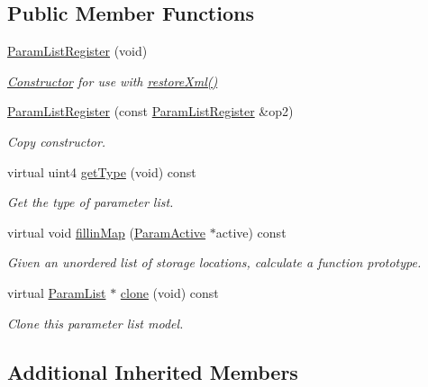 \subsection*{Public Member Functions}
\begin{DoxyCompactItemize}
\item 
\mbox{\hyperlink{class_param_list_register_aca64ac19f3dc898fc7d12062c76acf59}{Param\+List\+Register}} (void)
\begin{DoxyCompactList}\small\item\em \mbox{\hyperlink{class_constructor}{Constructor}} for use with \mbox{\hyperlink{class_param_list_standard_a7dc8219ff6422f4e23d12643b68eb100}{restore\+Xml()}} \end{DoxyCompactList}\item 
\mbox{\hyperlink{class_param_list_register_ab6c82537acb4d9e382dcbf438baebd0d}{Param\+List\+Register}} (const \mbox{\hyperlink{class_param_list_register}{Param\+List\+Register}} \&op2)
\begin{DoxyCompactList}\small\item\em Copy constructor. \end{DoxyCompactList}\item 
virtual uint4 \mbox{\hyperlink{class_param_list_register_af11af105230d3d6bf2824ae8b6a527a6}{get\+Type}} (void) const
\begin{DoxyCompactList}\small\item\em Get the type of parameter list. \end{DoxyCompactList}\item 
virtual void \mbox{\hyperlink{class_param_list_register_a35bf1a7b1033500cb3657608c27d4786}{fillin\+Map}} (\mbox{\hyperlink{class_param_active}{Param\+Active}} $\ast$active) const
\begin{DoxyCompactList}\small\item\em Given an unordered list of storage locations, calculate a function prototype. \end{DoxyCompactList}\item 
virtual \mbox{\hyperlink{class_param_list}{Param\+List}} $\ast$ \mbox{\hyperlink{class_param_list_register_a1c4f79c909f11b3859f93f293acb9a1d}{clone}} (void) const
\begin{DoxyCompactList}\small\item\em Clone this parameter list model. \end{DoxyCompactList}\end{DoxyCompactItemize}
\subsection*{Additional Inherited Members}


